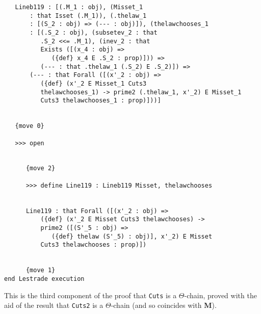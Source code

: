 \documentclass[12pt]{article}
\begin{document}
\begin{verbatim}
   Lineb119 : [(.M_1 : obj), (Misset_1 
       : that Isset (.M_1)), (.thelaw_1 
       : [(S_2 : obj) => (--- : obj)]), (thelawchooses_1 
       : [(.S_2 : obj), (subsetev_2 : that 
          .S_2 <<= .M_1), (inev_2 : that 
          Exists ([(x_4 : obj) => 
             ({def} x_4 E .S_2 : prop)])) => 
          (--- : that .thelaw_1 (.S_2) E .S_2)]) => 
       (--- : that Forall ([(x'_2 : obj) => 
          ({def} (x'_2 E Misset_1 Cuts3 
          thelawchooses_1) -> prime2 (.thelaw_1, x'_2) E Misset_1 
          Cuts3 thelawchooses_1 : prop)]))]


   {move 0}

   >>> open


      {move 2}

      >>> define Line119 : Lineb119 Misset, thelawchooses


      Line119 : that Forall ([(x'_2 : obj) => 
          ({def} (x'_2 E Misset Cuts3 thelawchooses) -> 
          prime2 ([(S'_5 : obj) => 
             ({def} thelaw (S'_5) : obj)], x'_2) E Misset 
          Cuts3 thelawchooses : prop)])


      {move 1}
end Lestrade execution
\end{verbatim}

This is the third component of the proof that {\tt Cuts} is a $\Theta$-chain, proved with the aid of the result that {\tt Cuts2} is a $\Theta$-chain (and so coincides with {\bf M}).
\end{document}
